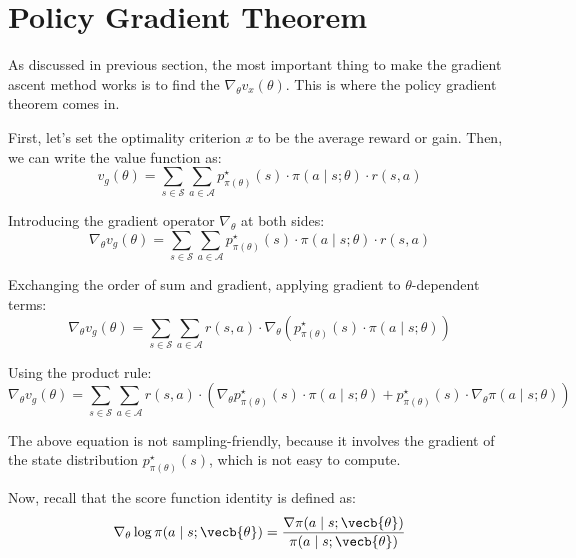 \section{Policy Gradient Theorem}
\label{sec:policy_gradient_theorem}

As discussed in previous section, the most important thing to make the gradient ascent method works is to find the $\nabla_\theta v_x(\theta)$. 
This is where the policy gradient theorem comes in.

First, let's set the optimality criterion $x$ to be the average reward or gain.
Then, we can write the value function as:
\begin{equation}
    v_g(\theta) = \sum_{s \in \mathcal{S}} \sum_{a \in \mathcal{A}} p_{\pi(\theta)}^\star(s) \cdot \pi(a \mid s; \theta) \cdot r(s, a) 
\end{equation}

Introducing the gradient operator $\nabla_\theta$ at both sides:
\begin{equation}
    \nabla_\theta v_g(\theta) = \sum_{s \in \mathcal{S}} \sum_{a \in \mathcal{A}} p_{\pi(\theta)}^\star(s) \cdot \pi(a \mid s; \theta) \cdot r(s, a) 
\end{equation}

Exchanging the order of sum and gradient, applying gradient to $\theta$-dependent terms:
\begin{equation}
    \nabla_\theta v_g(\theta) = \sum_{s \in \mathcal{S}} \sum_{a \in \mathcal{A}} r(s, a) \cdot \nabla_\theta \left(p_{\pi(\theta)}^\star(s) \cdot \pi(a \mid s; \theta) \right) 
\end{equation}

Using the product rule:
\begin{equation}
    \nabla_\theta v_g(\theta) = \sum_{s \in \mathcal{S}} \sum_{a \in \mathcal{A}} r(s, a)  \cdot \left( \nabla_\theta p_{\pi(\theta)}^\star(s) \cdot \pi(a \mid s; \theta) + p_{\pi(\theta)}^\star(s) \cdot \nabla_\theta \pi(a \mid s; \theta) \right)
    \label{eq:product_rule}
\end{equation}

The above equation is not sampling-friendly, because it involves the gradient of the state distribution $p_{\pi(\theta)}^\star(s)$, which is not easy to compute.

Now, recall that the score function identity is defined as:
\begin{equation}
    \nabla_\theta \log \pi(a \mid s ; \vecb{\theta}) = \frac{\nabla \pi(a \mid s ; \vecb{\theta})}{\pi(a \mid s ; \vecb{\theta})}
\end{equation}

